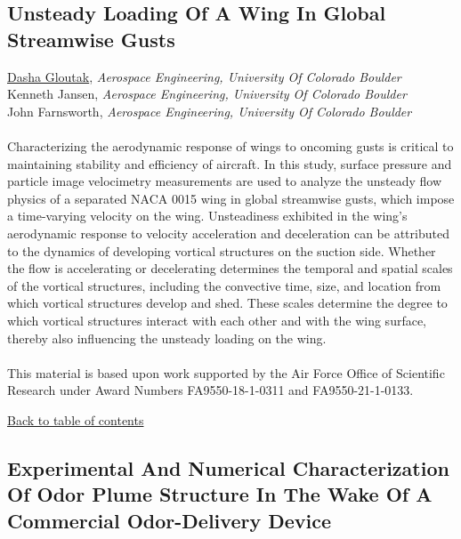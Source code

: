 \hypertarget{DashaGloutak}{\subsection*{\color{CUGOLD} Unsteady Loading Of A Wing In Global Streamwise Gusts}} \vsp 
\underline{Dasha Gloutak}, \textit{Aerospace Engineering, University Of Colorado Boulder}\\ 
{Kenneth Jansen}, \textit{Aerospace Engineering, University Of Colorado Boulder}\\ 
{John Farnsworth}, \textit{Aerospace Engineering, University Of Colorado Boulder}\\ 
\vspace{-0.1 in} \\ 
\noindent Characterizing the aerodynamic response of wings to oncoming gusts is critical to maintaining stability and efficiency of aircraft. In this study, surface pressure and particle image velocimetry measurements are used to analyze the unsteady flow physics of a separated NACA 0015 wing in global streamwise gusts, which impose a time-varying velocity on the wing. Unsteadiness exhibited in the wing’s aerodynamic response to velocity acceleration and deceleration can be attributed to the dynamics of developing vortical structures on the suction side. Whether the flow is accelerating or decelerating determines the temporal and spatial scales of the vortical structures, including the convective time, size, and location from which vortical structures develop and shed. These scales determine the degree to which vortical structures interact with each other and with the wing surface, thereby also influencing the unsteady loading on the wing. \\ 
\noindent  \\ 
\noindent  *This material is based upon work supported by the Air Force Office of Scientific Research under Award Numbers FA9550-18-1-0311 and FA9550-21-1-0133. \\ 
\begin{flushright}\vspace{-0.2 in}\hyperlink{toc}{Back to table of contents}\end{flushright}\vspace{-0.2 in}
\hypertarget{LarsLarson}{\subsection*{\color{CUGOLD} Experimental And Numerical Characterization Of Odor Plume Structure In The Wake Of A Commercial Odor-Delivery Device}} \vsp 
